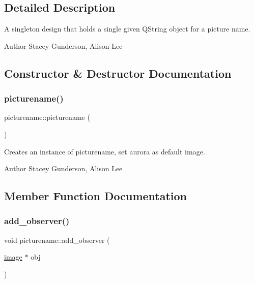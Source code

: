 \subsection{Detailed Description}
A singleton design that holds a single given Q\+String object for a picture name. 

\begin{DoxyAuthor}{Author}
Stacey Gunderson, Alison Lee 
\end{DoxyAuthor}


\subsection{Constructor \& Destructor Documentation}
\mbox{\label{classpicturename_a446962c869c6f39fd01688d94f9cde1b}} 
\subsubsection{\texorpdfstring{picturename()}{picturename()}}
{\footnotesize\ttfamily picturename\+::picturename (\begin{DoxyParamCaption}{ }\end{DoxyParamCaption})\hspace{0.3cm}{\ttfamily [protected]}}



Creates an instance of picturename, set aurora as default image. 

\begin{DoxyAuthor}{Author}
Stacey Gunderson, Alison Lee 
\end{DoxyAuthor}


\subsection{Member Function Documentation}
\mbox{\label{classpicturename_a4b95f1c195e8ef08203f3e3204db5bfe}} 
\subsubsection{\texorpdfstring{add\+\_\+observer()}{add\_observer()}}
{\footnotesize\ttfamily void picturename\+::add\+\_\+observer (\begin{DoxyParamCaption}\item[{\mbox{\hyperlink{classimage}{image}} $\ast$}]{obj }\end{DoxyParamCaption})}



